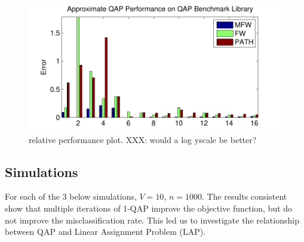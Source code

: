 \begin{figure}[htbp]
	\centering			
	\includegraphics[width=1.0\linewidth]{../figs/benchmarks.pdf}
	\caption{relative performance plot. XXX: would a log yscale be better?}
	\label{fig:fwpath}
\end{figure}


\subsection{Simulations}

For each of the 3 below simulations, $V=10$, $n=1000$.  The results consistent show that multiple iterations of 1-QAP improve the objective function, but do not improve the misclassification rate.  This led us to investigate the relationship between QAP and Linear Assignment Problem (LAP).


